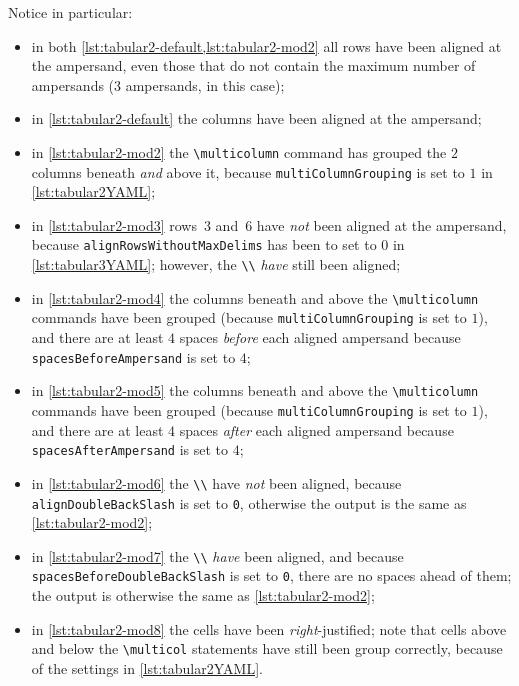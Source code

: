 \begin{example}
 Notice in particular:
 \begin{itemize}
  \item in both \cref{lst:tabular2-default,lst:tabular2-mod2} all rows have been aligned
        at the ampersand, even those that do not contain the maximum number of ampersands
        (3 ampersands, in this case);
  \item in \cref{lst:tabular2-default} the columns have been aligned at the ampersand;
  \item in \cref{lst:tabular2-mod2} the \lstinline!\multicolumn! command has grouped the
        $2$ columns beneath \emph{and} above it, because \texttt{multiColumnGrouping} is
        set to $1$ in \cref{lst:tabular2YAML};
  \item in \cref{lst:tabular2-mod3} rows~3 and~6 have \emph{not} been aligned at the
        ampersand, because \texttt{alignRowsWithoutMaxDelims} has been to set to $0$ in
        \cref{lst:tabular3YAML}; however, the \lstinline!\\! \emph{have} still been
        aligned;
  \item in \cref{lst:tabular2-mod4} the columns beneath and above the
        \lstinline!\multicolumn! commands have been grouped (because
        \texttt{multiColumnGrouping} is set to $1$), and there are at least $4$ spaces
        \emph{before} each aligned ampersand because \texttt{spacesBeforeAmpersand} is
        set to $4$;
  \item in \cref{lst:tabular2-mod5} the columns beneath and above the
        \lstinline!\multicolumn! commands have been grouped (because
        \texttt{multiColumnGrouping} is set to $1$), and there are at least $4$ spaces
        \emph{after} each aligned ampersand because \texttt{spacesAfterAmpersand} is set
        to $4$;
  \item in \cref{lst:tabular2-mod6} the \lstinline!\\! have \emph{not} been aligned,
        because \texttt{alignDoubleBackSlash} is set to \texttt{0}, otherwise the output
        is the same as \cref{lst:tabular2-mod2};
  \item in \cref{lst:tabular2-mod7} the \lstinline!\\! \emph{have} been aligned, and
        because \texttt{spacesBeforeDoubleBackSlash} is set to \texttt{0}, there are no
        spaces ahead of them; the output is otherwise the same as
        \cref{lst:tabular2-mod2};
  \item in \cref{lst:tabular2-mod8} the cells have been \emph{right}-justified; note that
        cells above and below the \lstinline!\multicol! statements have still been group
        correctly, because of the settings in \cref{lst:tabular2YAML}.
 \end{itemize}
 \end{example}

